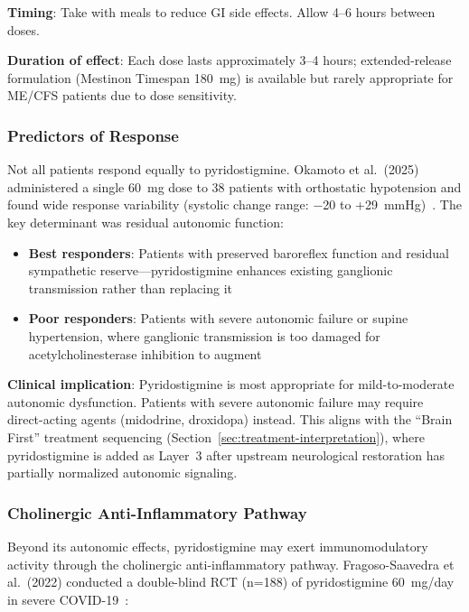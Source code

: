 \textbf{Timing}: Take with meals to reduce GI side effects. Allow 4--6 hours between doses.

\textbf{Duration of effect}: Each dose lasts approximately 3--4 hours; extended-release formulation (Mestinon Timespan 180~mg) is available but rarely appropriate for ME/CFS patients due to dose sensitivity.

\subsubsection{Predictors of Response}

Not all patients respond equally to pyridostigmine. Okamoto et al.\ (2025) administered a single 60~mg dose to 38 patients with orthostatic hypotension and found wide response variability (systolic change range: $-$20 to +29~mmHg)~\cite{Okamoto2025pyridostigmine}. The key determinant was residual autonomic function:

\begin{itemize}
    \item \textbf{Best responders}: Patients with preserved baroreflex function and residual sympathetic reserve---pyridostigmine enhances existing ganglionic transmission rather than replacing it
    \item \textbf{Poor responders}: Patients with severe autonomic failure or supine hypertension, where ganglionic transmission is too damaged for acetylcholinesterase inhibition to augment
\end{itemize}

\textbf{Clinical implication}: Pyridostigmine is most appropriate for mild-to-moderate autonomic dysfunction. Patients with severe autonomic failure may require direct-acting agents (midodrine, droxidopa) instead. This aligns with the ``Brain First'' treatment sequencing (Section~\ref{sec:treatment-interpretation}), where pyridostigmine is added as Layer~3 after upstream neurological restoration has partially normalized autonomic signaling.

\subsubsection{Cholinergic Anti-Inflammatory Pathway}

Beyond its autonomic effects, pyridostigmine may exert immunomodulatory activity through the cholinergic anti-inflammatory pathway. Fragoso-Saavedra et al.\ (2022) conducted a double-blind RCT (n=188) of pyridostigmine 60~mg/day in severe COVID-19~\cite{FragosoSaavedra2022pisco}:

